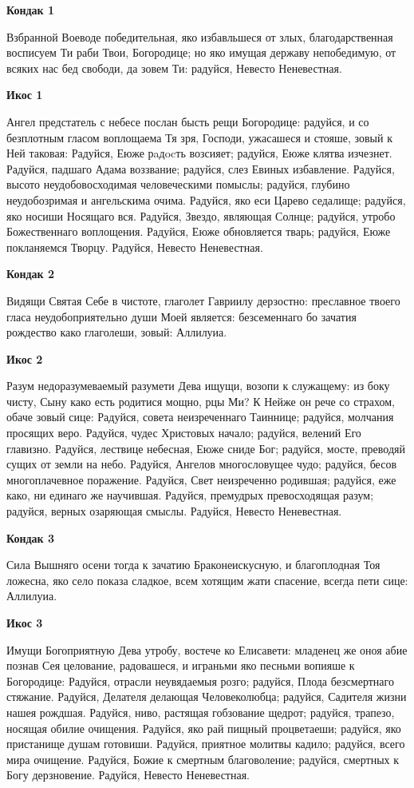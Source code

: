 \bfseries Кондак 1\normalfont{}\nopagebreak

Взбранной Воеводе победительная, яко избавльшеся от злых, благодарственная восписуем Ти раби Твои, Богородице; но яко имущая державу непобедимую, от всяких нас бед свободи, да зовем Ти: радуйся, Невесто Неневестная.


\bfseries Икос 1\normalfont{}\nopagebreak

Ангел предстатель с небесе послан бысть рещи Богородице: радуйся, и со безплотным гласом воплощаема Тя зря, Господи, ужасашеся и стояше, зовый к Ней таковая: Радуйся, Еюже рaдocть возсияет; радуйся, Еюже клятва изчезнет. Радуйся, падшаго Адама воззвание; радуйся, слез Евиных избавление. Радуйся, высото неудобовосходимая человеческими помыслы; радуйся, глубино неудобозримая и ангельскима очима. Радуйся, яко еси Царево седалище; радуйся, яко носиши Носящаго вся. Радуйся, Звездо, являющая Солнце; радуйся, утробо Божественнаго воплощения. Радуйся, Еюже обновляется тварь; радуйся, Еюже покланяемся Творцу. Радуйся, Невесто Неневестная.


\bfseries Кондак 2\normalfont{}\nopagebreak

Видящи Святая Себе в чистоте, глаголет Гавриилу дерзостно: преславное твоего гласа неудобоприятельно души Моей является: безсеменнаго бо зачатия рождество како глаголеши, зовый: Аллилуиа.


\bfseries Икос 2\normalfont{}\nopagebreak

Разум недоразумеваемый разумети Дева ищущи, возопи к служащему: из боку чисту, Сыну како есть родитися мощно, рцы Ми? К Нейже он рече со страхом, обаче зовый сице: Радуйся, совета неизреченнаго Таиннице; радуйся, молчания просящих веро. Радуйся, чудес Христовых начало; радуйся, велений Его главизно. Радуйся, лествице небесная, Еюже сниде Бог; радуйся, мосте, преводяй сущих от земли на небо. Радуйся, Ангелов многословущее чудо; радуйся, бесов многоплачевное поражение. Радуйся, Свет неизреченно родившая; радуйся, еже како, ни единаго же научившая. Радуйся, премудрых превосходящая разум; радуйся, верных озаряющая смыслы. Радуйся, Невесто Неневестная.


\bfseries Кондак 3\normalfont{}\nopagebreak


Сила Вышняго осени тогда к зачатию Браконеискусную, и благоплодная Тоя ложесна, яко село показа сладкое, всем хотящим жати спасение, всегда пети сице: Аллилуиа.


\bfseries Икос 3\normalfont{}\nopagebreak


Имущи Богоприятную Дева утробу, востече ко Елисавети: младенец же оноя абие познав Сея целование, радовашеся, и играньми яко песньми вопияше к Богородице: Радуйся, отрасли неувядаемыя розго; радуйся, Плода безсмертнаго стяжание. Радуйся, Делателя делающая Человеколюбца; радуйся, Садителя жизни нашея рождшая. Радуйся, ниво, растящая гобзование щедрот; радуйся, трапезо, носящая обилие очищения. Радуйся, яко рай пищный процветаеши; радуйся, яко пристанище душам готовиши. Радуйся, приятное молитвы кадило; радуйся, всего мира очищение. Радуйся, Божие к смертным благоволение; радуйся, смертных к Богу дерзновение. Радуйся, Невесто Неневестная.


